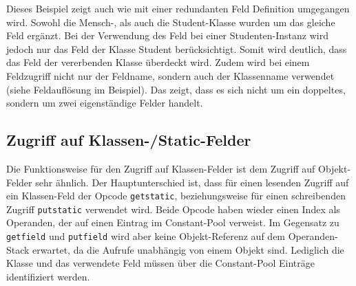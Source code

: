 \documentclass[conference]{IEEEtran}
\begin{document}
Dieses Beispiel zeigt auch wie mit einer redundanten Feld Definition umgegangen wird. Sowohl die Mensch-, als auch die Student-Klasse wurden um das gleiche Feld ergänzt. Bei der Verwendung des Feld bei einer Studenten-Instanz wird jedoch nur das Feld der Klasse Student berücksichtigt. Somit wird deutlich, dass das Feld der vererbenden Klasse überdeckt wird. Zudem wird bei einem Feldzugriff nicht nur der Feldname, sondern auch der Klassenname verwendet (siehe Feldauflösung im Beispiel). Das zeigt, dass es sich nicht um ein doppeltes, sondern um zwei eigenständige Felder handelt. \cite{Venners.1996}


\subsection{Zugriff auf Klassen-/Static-Felder}
Die Funktionsweise für den Zugriff auf Klassen-Felder ist dem Zugriff auf Objekt-Felder sehr ähnlich. Der Hauptunterschied ist, dass für einen lesenden Zugriff auf ein Klassen-Feld der Opcode \verb|getstatic|, beziehungsweise für einen schreibenden Zugriff \verb|putstatic| verwendet wird. Beide Opcode haben wieder einen Index als Operanden, der auf einen Eintrag im Constant-Pool verweist. Im Gegensatz zu \verb|getfield| und \verb|putfield| wird aber keine Objekt-Referenz auf dem Operanden-Stack erwartet, da die Aufrufe unabhängig von einem Objekt sind. Lediglich die Klasse und das verwendete Feld müssen über die Constant-Pool Einträge identifiziert werden.


 
\end{document}
